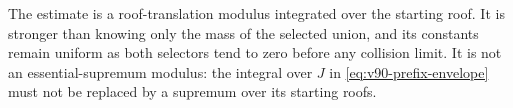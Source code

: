 The estimate is a roof-translation modulus integrated over the starting
roof. It is stronger than knowing only the mass of the selected union,
and its constants remain uniform as both selectors tend to zero before
any collision limit. It is not an essential-supremum modulus: the
integral over $J$ in \eqref{eq:v90-prefix-envelope} must not be replaced
by a supremum over its starting roofs.
